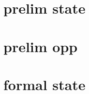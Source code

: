 \documentclass[]{article}
\begin{document}
\tableofcontents

\clearpage

\section{prelim state}




% 


% 

\clearpage
\section{prelim opp}




% 

\clearpage
\section{formal state}
\end{document}
